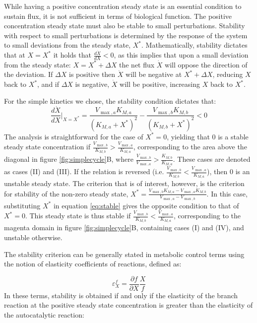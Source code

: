     While having a positive concentration steady state is an essential condition to sustain flux, it is not sufficient in terms of biological function.
    The positive concentration steady state must also be stable to small perturbations.
    Stability with respect to small perturbations is determined by the response of the system to small deviations from the steady state, $X^*$.
    Mathematically, stability dictates that at $X=X^*$ it holds that $\frac{d\dot X}{dX} <0$, as this  implies that upon a small deviation from the steady state: $X = X^*+\Delta X$ the net flux $\dot X$ will oppose the direction of the deviation.
    If $\Delta X$ is positive then $\dot X$ will be negative at $X^*+\Delta X$, reducing $X$ back to $X^*$, and if $\Delta X$ is negative, $\dot X$ will be positive, increasing $X$ back to $X^*$.

    For the simple kinetics we chose, the stability condition dictates that:
    \begin{equation}
        \label{eq:stable}
      \frac{d\dot X}{dX}\Big\vert_{X=X^*} = \frac{V_{\max,a}K_{M,a}}{(K_{M,a}+X^*)^2}-\frac{V_{\max,b}K_{M,b}}{(K_{M,b}+X^*)^2}<0
    \end{equation}
    The analysis is straightforward for the case of $X^*=0$, yielding that $0$ is a stable steady state concentration if $\frac{V_{\max,b}}{K_{M,b}}>\frac{V_{\max,a}}{K_{M,a}}$, corresponding to the area above the diagonal in figure \ref{fig:simplecycle}B, where $\frac{V_{\max,b}}{V_{\max,a}}>\frac{K_{M,b}}{K_{M,a}}$. These cases are denoted as cases (II) and (III).
    If the relation is reversed (i.e. $\frac{V_{\max,b}}{K_{M,b}}<\frac{V_{\max,a}}{K_{M,a}}$), then $0$ is an unstable steady state.
    The criterion that is of interest, however, is the criterion for stability of the non-zero steady state, $X^*=\frac{V_{\max,b}K_{M,a}-V_{\max,a}K_{M,b}}{V_{\max,a}-V_{\max,b}}$.
    In this case, substituting $X^*$ in equation \ref{eq:stable} gives the opposite condition to that of $X^*=0$.
    This steady state is thus stable if $\frac{V_{\max,b}}{K_{M,b}}<\frac{V_{\max,a}}{K_{M,a}}$, corresponding to the magenta domain in figure \ref{fig:simplecycle}B, containing cases (I) and (IV), and unstable otherwise.

    The stability criterion can be generally stated in metabolic control terms \cite{Fell1997-bp} using the notion of elasticity coefficients of reactions, defined as:

    \begin{equation*}
    \varepsilon^f_X=\frac{\partial f}{\partial X}\frac{X}{f}
    \end{equation*}
    In these terms, stability is obtained if and only if the elasticity of the branch reaction at the positive steady state concentration is greater than the elasticity of the autocatalytic reaction:

